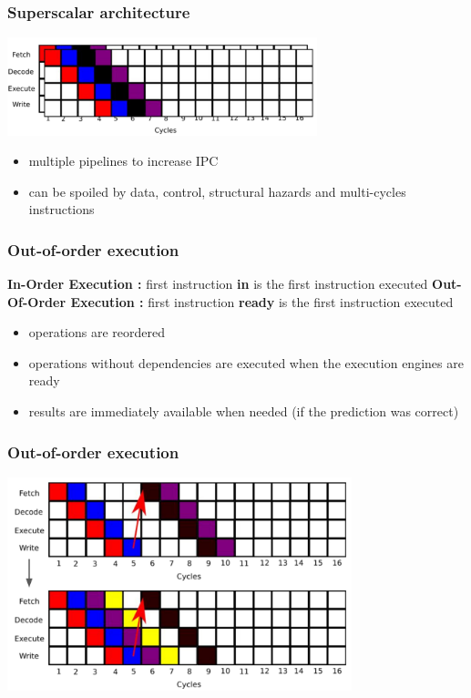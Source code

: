 \begin{frame}[containsverbatim]
\frametitle{Superscalar architecture}
\begin{center}
\includegraphics[width=9cm]{DayGilles/images/pipeline-superscalar.jpg}
\end{center}
\begin{itemize}
\item multiple pipelines to increase IPC
\item can be spoiled by data, control, structural hazards and multi-cycles instructions
\end{itemize}
\end{frame}


\begin{frame}[containsverbatim]
\frametitle{Out-of-order execution}
\textbf{In-Order Execution :} first instruction \textbf{in} is the first instruction executed
\vfill
\textbf{Out-Of-Order Execution :} first instruction \textbf{ready} is the first instruction executed
\begin{itemize}
\item operations are reordered
\item operations without dependencies are executed when the execution engines are ready
\item results are immediately available when needed (if the prediction was correct)
\end{itemize}
\end{frame}


\begin{frame}[containsverbatim]
\frametitle{Out-of-order execution}
\begin{center}
\includegraphics[width=10cm]{DayGilles/images/pipeline-outoforder.jpg}
\end{center}
\end{frame}



